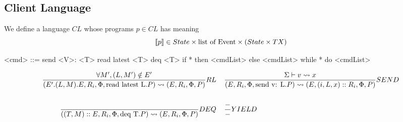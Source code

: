 \documentclass[acmsmall,review,anonymous]{acmart}\settopmatter{printfolios=true}
\begin{document}
\subsection{Client Language}

We define a language $CL$ whose programs $p\in CL$ has meaning \[\semfunc[p] \in State \times \text{list of Event} \times (State \times TX)\]

\begin{grammar}
	<cmd> ::= send <V>: <T>
         \alt read latest <T>
         \alt deq <T>
         \alt if * then <cmdList> else <cmdList>
         \alt while * do <cmdList>
\end{grammar}

\begin{align*}
\judge{RL}{
	\forall M', (L, M') \notin E'
}{
	(E'.(L, M).E, R_i, \Phi, \text{read latest L}.P) \reduce (E, R_i, \Phi, P)
}& \;\;\;\;
\judge{SEND}{
	\Sigma \vdash v \reduce x
}{
	(E, R_i, \Phi, \text{send v: L}.P)\reduce (E, (i, L, x)::R_i, \Phi, P)
}\\
\\
\judge{DEQ}{
	\;
}{
	((T, M)::E, R_i, \Phi, \text{deq T}.P) \reduce (E, R_i, \Phi, P)
} & \;\;\;\;
\judge{YIELD}{
	 -
}{
	-
}
\end{align*}





% 
% 






\newpage





\newpage

\appendix

% 

%
\end{document}
